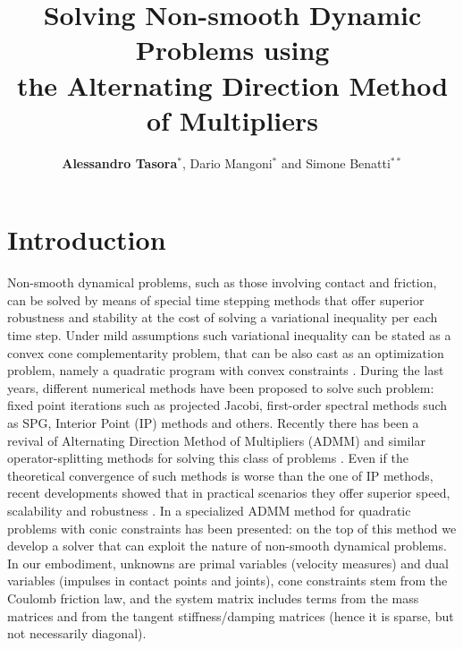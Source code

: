 \documentclass[11pt]{nodycon2021}
\title{Solving Non-smooth Dynamic Problems using \\ the 
Alternating Direction Method of Multipliers }
\author{\textbf{Alessandro Tasora}$^\ast$, Dario Mangoni$^\ast$ and Simone Benatti$^{\ast\ast}$}
\begin{document}
\section{Introduction}

Non-smooth dynamical problems, such as those involving contact and friction, can be solved by means of special time stepping methods that offer superior robustness and stability at the cost of solving a variational inequality per each time step.
Under mild assumptions such variational inequality can be stated as a convex cone complementarity problem, that can be also cast as an optimization problem, namely a quadratic program with convex constraints \cite{anitescuTasora2008}. During the last years, different numerical methods have been proposed to solve such problem: fixed point iterations such as projected Jacobi, first-order spectral methods such as SPG, Interior Point (IP) methods and others. Recently there has been a revival of Alternating Direction Method of Multipliers (ADMM) and similar operator-splitting methods for solving this class of problems \cite{Goldstein2014}. %
Even if the theoretical convergence of such methods is worse than the one of IP methods, recent developments showed that in practical scenarios they offer superior speed, scalability and robustness 
\cite{Cannon2019}. %
In 
\cite{Stellato2020} %
a specialized ADMM method for quadratic problems with conic constraints has been presented: on the top of this method we develop a solver that can exploit the nature of non-smooth dynamical problems. In our embodiment, unknowns are primal variables (velocity measures) and dual variables (impulses in contact points and joints), cone constraints stem from the Coulomb friction law, and the system matrix includes terms from the mass matrices and from the tangent stiffness/damping matrices (hence it is sparse, but not necessarily diagonal).
\end{document}
